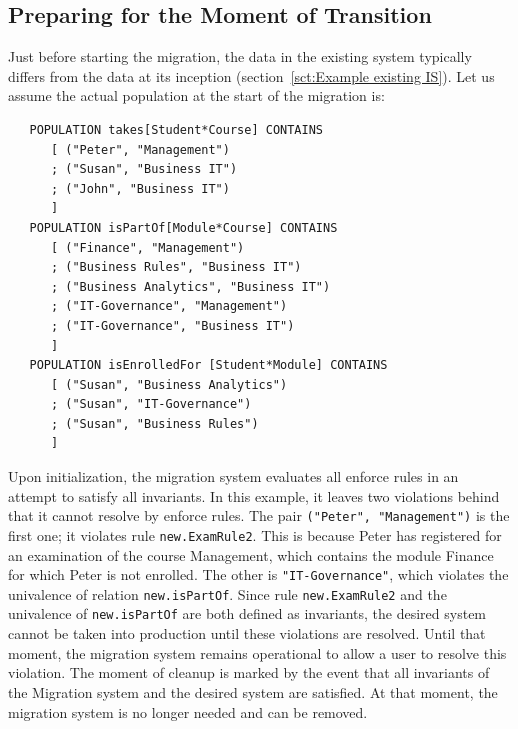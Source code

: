 \documentclass[runningheads]{llncs}
\begin{document}
\subsection{Preparing for the Moment of Transition}
   Just before starting the migration,
   the data in the existing system typically differs from the data at its inception (section~\ref{sct:Example existing IS}).
   Let us assume the actual population at the start of the migration is:
\begin{verbatim}
   POPULATION takes[Student*Course] CONTAINS
      [ ("Peter", "Management")
      ; ("Susan", "Business IT")
      ; ("John", "Business IT")
      ]
   POPULATION isPartOf[Module*Course] CONTAINS
      [ ("Finance", "Management")
      ; ("Business Rules", "Business IT")
      ; ("Business Analytics", "Business IT")
      ; ("IT-Governance", "Management")
      ; ("IT-Governance", "Business IT")
      ]
   POPULATION isEnrolledFor [Student*Module] CONTAINS
      [ ("Susan", "Business Analytics")
      ; ("Susan", "IT-Governance")
      ; ("Susan", "Business Rules")
      ]
\end{verbatim}

   Upon initialization, the migration system evaluates all enforce rules in an attempt to satisfy all invariants.
   In this example, it leaves two violations behind that it cannot resolve by enforce rules.
   The pair {\tt ("Peter", "Management")} is the first one; it violates rule {\tt new.ExamRule2}.
   This is because Peter has registered for an examination of the course Management,
   which contains the module Finance for which Peter is not enrolled.
   The other is {\tt "IT-Governance"}, which violates the univalence of relation {\tt new.isPartOf}.
   Since rule {\tt new.ExamRule2} and the univalence of {\tt new.isPartOf} are both defined as invariants,
   the desired system cannot be taken into production until these violations are resolved.
   Until that moment, the migration system remains operational to allow a user to resolve this violation. 
   The moment of cleanup is marked by the event that all invariants of the Migration system and the desired system are satisfied.
   At that moment, the migration system is no longer needed and can be removed.
\end{document}

